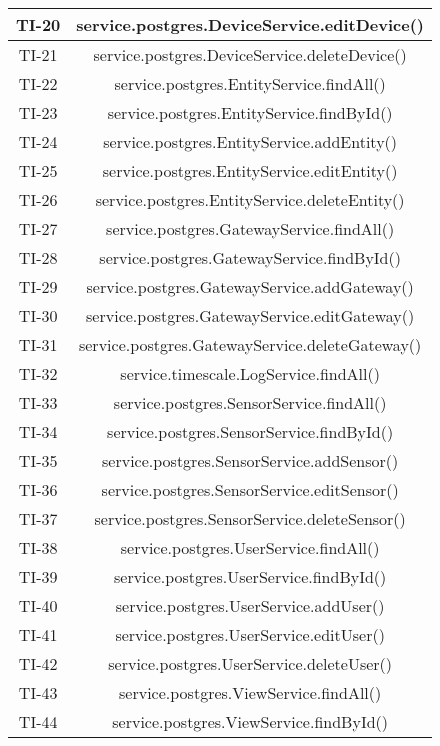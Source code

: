 \begin{center}
\begin{longtable}{|c|c|}
			\hline
			TI-20 & service.postgres.DeviceService.editDevice() \\
			\hline
			TI-21 & service.postgres.DeviceService.deleteDevice() \\
			\hline
			TI-22 & service.postgres.EntityService.findAll() \\
			\hline
			TI-23 & service.postgres.EntityService.findById() \\
			\hline
			TI-24 & service.postgres.EntityService.addEntity() \\
			\hline
			TI-25 & service.postgres.EntityService.editEntity() \\
			\hline
			TI-26 & service.postgres.EntityService.deleteEntity() \\
			\hline
			TI-27 & service.postgres.GatewayService.findAll() \\
			\hline
			TI-28 & service.postgres.GatewayService.findById() \\
			\hline
			TI-29 & service.postgres.GatewayService.addGateway() \\
			\hline
			TI-30 & service.postgres.GatewayService.editGateway() \\
			\hline
			TI-31 & service.postgres.GatewayService.deleteGateway() \\
			\hline
			TI-32 & service.timescale.LogService.findAll() \\
			\hline
			TI-33 & service.postgres.SensorService.findAll() \\
			\hline
			TI-34 & service.postgres.SensorService.findById() \\
			\hline
			TI-35 & service.postgres.SensorService.addSensor() \\
			\hline
			TI-36 & service.postgres.SensorService.editSensor() \\
			\hline
			TI-37 & service.postgres.SensorService.deleteSensor() \\
			\hline
			TI-38 & service.postgres.UserService.findAll() \\
			\hline
			TI-39 & service.postgres.UserService.findById() \\
			\hline
			TI-40 & service.postgres.UserService.addUser() \\
			\hline
			TI-41 & service.postgres.UserService.editUser() \\
			\hline
			TI-42 & service.postgres.UserService.deleteUser() \\
			\hline
			TI-43 & service.postgres.ViewService.findAll() \\
			\hline
			TI-44 & service.postgres.ViewService.findById() \\

\end{longtable}
\end{center}
